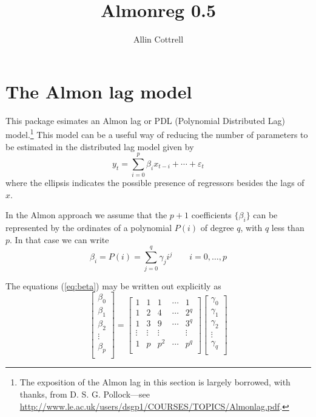 \documentclass{article}
\begin{document}
\setlength{\parindent}{0pt}
\setlength{\parskip}{1ex}

\title{Almonreg 0.5}
\author{Allin Cottrell}
\maketitle

\section{The Almon lag model}

This package esimates an Almon lag or PDL (Polynomial Distributed Lag)
model.\footnote{The exposition of the Almon lag in this section is
  largely borrowed, with thanks, from D. S. G. Pollock---see
  \url{http://www.le.ac.uk/users/dsgp1/COURSES/TOPICS/Almonlag.pdf}.}
This model can be a useful way of reducing the number of parameters to
be estimated in the distributed lag model given by
%
\begin{equation}
\label{eq:dl}
y_t = \sum_{i=0}^p \beta_i x_{t-i} + \cdots + \varepsilon_t
\end{equation}
%
where the ellipsis indicates the possible presence of regressors
besides the lags of $x$.

In the Almon approach we assume that the $p+1$ coefficients
$\{\beta_i\}$ can be represented by the ordinates of a polynomial
$P(i)$ of degree $q$, with $q$ less than $p$. In that case we can
write
%
\begin{equation}
\label{eq:beta}
\beta_i = P(i) = \sum_{j=0}^q \gamma_j i^j \qquad i=0,\dots,p
\end{equation}

The equations (\ref{eq:beta}) may be written out explicitly as
%
\begin{equation*}
\left[
\begin{array}{c}
\beta_0 \\
\beta_1 \\
\beta_2 \\
\vdots \\
\beta_p \\
\end{array}
\right]
=
\left[
\begin{array}{ccccc}
1 & 1 & 1 & \cdots & 1 \\
1 & 2 & 4 & \cdots & 2^q \\
1 & 3 & 9 & \cdots & 3^q \\
\vdots & \vdots & \vdots & & \vdots \\
1 & p & p^2 & \cdots & p^q \\
\end{array}
\right]
\left[
\begin{array}{c}
\gamma_0 \\
\gamma_1 \\
\gamma_2 \\
\vdots \\
\gamma_q \\
\end{array}
\right]
\end{equation*}
\end{document}
